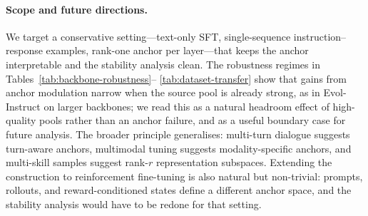 \paragraph{Scope and future directions.}
We target a conservative setting---text-only SFT, single-sequence
instruction--response examples, rank-one anchor per layer---that keeps
the anchor interpretable and the stability analysis clean. The
robustness regimes in Tables~\ref{tab:backbone-robustness}--%
\ref{tab:dataset-transfer} show that gains from anchor modulation
narrow when the source pool is already strong, as in Evol-Instruct on
larger backbones; we read this as a natural headroom effect of
high-quality pools rather than an anchor failure, and as a useful
boundary case for future analysis. The broader principle generalises:
multi-turn dialogue suggests turn-aware anchors, multimodal tuning
suggests modality-specific anchors, and multi-skill samples suggest
rank-\(r\) representation subspaces. Extending the construction to
reinforcement fine-tuning is also natural but non-trivial: prompts,
rollouts, and reward-conditioned states define a different anchor space,
and the stability analysis would have to be redone for that setting.

